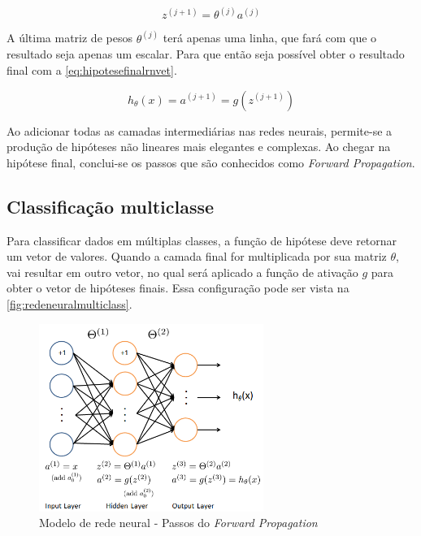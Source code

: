 \begin{equation} \label{eq:proximovetorz}
z^{(j+1)} =  \theta^{(j)}a^{(j)}
\end{equation}

A última matriz de pesos $\theta^{(j)}$ terá apenas uma linha, que fará com que o resultado seja apenas um escalar. Para que então seja possível obter o resultado final com a \autoref{eq:hipotesefinalrnvet}.

\begin{equation} \label{eq:hipotesefinalrnvet}
h_{\theta}(x) = a^{(j+1)} = g(z^{(j+1)})
\end{equation}

Ao adicionar todas as camadas intermediárias nas redes neurais, permite-se a produção de hipóteses não lineares mais elegantes e complexas. Ao chegar na hipótese final, conclui-se os passos que são conhecidos como \textit{Forward Propagation}.


\subsection{Classificação multiclasse}\label{subsec:clasmultirn}

Para classificar dados em múltiplas classes, a função de hipótese deve retornar um vetor de valores. Quando a camada final for multiplicada por sua matriz $\theta$, vai resultar em outro vetor, no qual será aplicado a função de ativação $g$ para obter o vetor de hipóteses finais. Essa configuração pode ser vista na \autoref{fig:redeneuralmulticlass}.

\begin{figure}
\centering
\caption{Modelo de rede neural - Passos do \textit{Forward Propagation}} \label{fig:redeneuralmulticlass}
\includegraphics[width=0.65\textwidth]{img/redeneuralmulticlass}
\end{figure}

